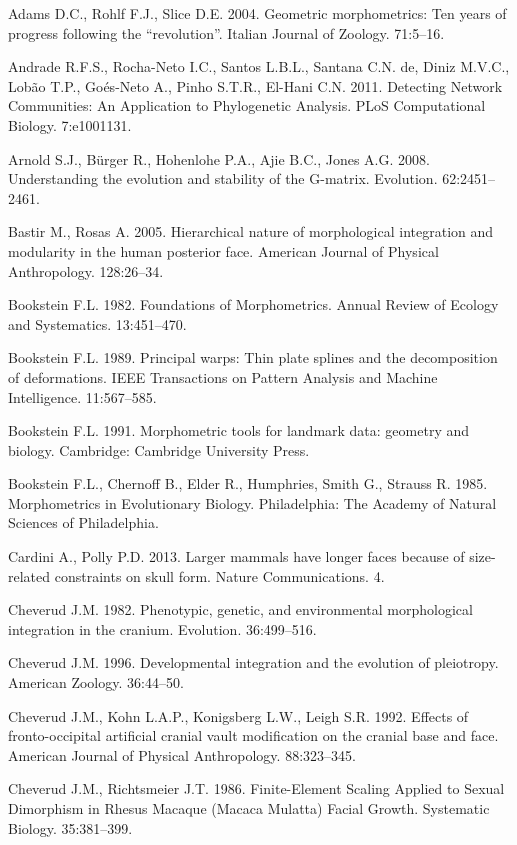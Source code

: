 \documentclass[12pt,]{article}
\begin{document}
Adams D.C., Rohlf F.J., Slice D.E. 2004. Geometric morphometrics: Ten
years of progress following the ``revolution''. Italian Journal of
Zoology. 71:5--16.

Andrade R.F.S., Rocha-Neto I.C., Santos L.B.L., Santana C.N. de, Diniz
M.V.C., Lobão T.P., Goés-Neto A., Pinho S.T.R., El-Hani C.N. 2011.
Detecting Network Communities: An Application to Phylogenetic Analysis.
PLoS Computational Biology. 7:e1001131.

Arnold S.J., Bürger R., Hohenlohe P.A., Ajie B.C., Jones A.G. 2008.
Understanding the evolution and stability of the G-matrix. Evolution.
62:2451--2461.

Bastir M., Rosas A. 2005. Hierarchical nature of morphological
integration and modularity in the human posterior face. American Journal
of Physical Anthropology. 128:26--34.

Bookstein F.L. 1982. Foundations of Morphometrics. Annual Review of
Ecology and Systematics. 13:451--470.

Bookstein F.L. 1989. Principal warps: Thin plate splines and the
decomposition of deformations. IEEE Transactions on Pattern Analysis and
Machine Intelligence. 11:567--585.

Bookstein F.L. 1991. Morphometric tools for landmark data: geometry and
biology. Cambridge: Cambridge University Press.

Bookstein F.L., Chernoff B., Elder R., Humphries, Smith G., Strauss R.
1985. Morphometrics in Evolutionary Biology. Philadelphia: The Academy
of Natural Sciences of Philadelphia.

Cardini A., Polly P.D. 2013. Larger mammals have longer faces because of
size-related constraints on skull form. Nature Communications. 4.

Cheverud J.M. 1982. Phenotypic, genetic, and environmental morphological
integration in the cranium. Evolution. 36:499--516.

Cheverud J.M. 1996. Developmental integration and the evolution of
pleiotropy. American Zoology. 36:44--50.

Cheverud J.M., Kohn L.A.P., Konigsberg L.W., Leigh S.R. 1992. Effects of
fronto-occipital artificial cranial vault modification on the cranial
base and face. American Journal of Physical Anthropology. 88:323--345.

Cheverud J.M., Richtsmeier J.T. 1986. Finite-Element Scaling Applied to
Sexual Dimorphism in Rhesus Macaque (Macaca Mulatta) Facial Growth.
Systematic Biology. 35:381--399.
\end{document}
